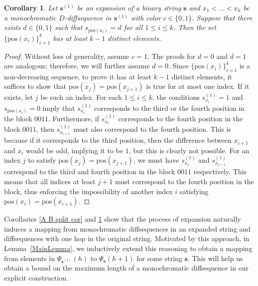 \documentclass[10pt,a4paper]{amsart}
\newtheorem{cor}{Corollary}
\begin{document}
\begin{cor}\label{pos bound cor}
   Let $\mathbf{s}^{(1)}$ be an expansion of a binary string $\mathbf{s}$ and $x_1<\dots<x_k$ be a monochromatic $D$-diffsequence in $\mathbf{s}^{(1)}$ with color $c\in\{0,1\}$. Suppose that there exists $d\in\{0,1\}$ such that $s_{\text{pos}(x_i)}=d$ for all $1\le i\le k$. Then the set $\{\text{pos}(x_i)\}^k_{i=1}$ has at least $k-1$ distinct elements.
\end{cor}
\begin{proof}
Without loss of generality, assume $c=1$. The proofs for $d=0$ and $d=1$ are analogous; therefore, we will further assume $ d=0$. Since $\{\text{pos}(x_i)\}^k_{i=1}$ is a non-decreasing sequence, to prove it has at least $k-1$ distinct elements, it suffices to show that $\text{pos}(x_j)=\text{pos}(x_{j+1})$ is true for at most one index. If it exists, let $j$ be such an index. For each $1\le i\le k$, the conditions $s^{(1)}_{x_i}=1$ and $s_{\text{pos}(x_i)}=0$ imply that $s^{(1)}_{x_i}$ corresponds to the third or the fourth position in the block $0011$. Furthermore, if $s^{(1)}_{x_i}$ corresponds to the fourth position in the block $0011$, then $s^{(1)}_{x_{i+1}}$ must also correspond to the fourth position. This is because if it corresponds to the third position, then the difference between $x_{i+1}$ and $x_i$ would be odd, implying it to be $1$, but this is clearly not possible. For an index $j$ to satisfy $\text{pos}(x_j)=\text{pos}(x_{j+1})$, we must have $s^{(1)}_{x_j}$ and $s^{(1)}_{x_{j+1}}$ correspond to the third and fourth position in the block $0011$ respectively. This means that all indices at least $j+1$ must correspond to the fourth position in the block, thus enforcing the impossibility of another index $i$ satisfying $\text{pos}(x_i)=\text{pos}(x_{i+1})$.
\end{proof}


Corollaries \ref{A B split cor} and \ref{pos bound cor} show that the process of expansion naturally induces a mapping from monochromatic diffsequences in an expanded string and diffsequences with one hop in the original string. Motivated by this approach, in Lemma~\ref{MainLemma}, we inductively extend this reasoning to obtain a mapping from elements in $\Psi_{\mathbf{s}^{(1)}}(h)$ to $\Psi_{\mathbf{s}}(h+1)$ for some string $\mathbf{s}$. This will help us obtain a bound on the maximum length of a monochromatic diffsequence in our explicit construction.
\end{document}
